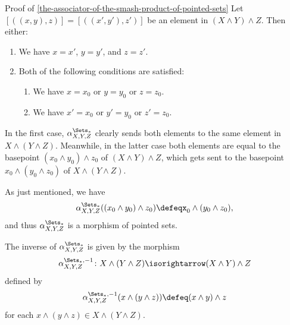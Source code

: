 \begin{Proof}{Proof of \cref{the-associator-of-the-smash-product-of-pointed-sets}}%
    Let $[((x,y),z)]=[((x',y'),z')]$ be an element in $(X\wedge Y)\wedge Z$. Then either:
    \begin{enumerate}
        \item We have $x=x'$, $y=y'$, and $z=z'$.
        \item Both of the following conditions are satisfied:
            \begin{enumerate}
                \item We have $x=x_{0}$ or $y=y_{0}$ or $z=z_{0}$.
                \item We have $x'=x_{0}$ or $y'=y_{0}$ or $z'=z_{0}$.
            \end{enumerate}
    \end{enumerate}
    In the first case, $\alpha^{\Sets_{*}}_{X,Y,Z}$ clearly sends both elements to the same element in $X\wedge(Y\wedge Z)$. Meanwhile, in the latter case both elements are equal to the basepoint $(x_{0}\wedge y_{0})\wedge z_{0}$ of $(X\wedge Y)\wedge Z$, which gets sent to the basepoint $x_{0}\wedge(y_{0}\wedge z_{0})$ of $X\wedge(Y\wedge Z)$.

    As just mentioned, we have
    \[
        \alpha^{\Sets_{*}}_{X,Y,Z}((x_{0}\wedge y_{0})\wedge z_{0})%
        \defeq%
        x_{0}\wedge(y_{0}\wedge z_{0}),%
    \]%
    and thus $\alpha^{\Sets_{*}}_{X,Y,Z}$ is a morphism of pointed sets.

    The inverse of $\alpha^{\Sets_{*}}_{X,Y,Z}$ is given by the morphism
    \[
        \alpha^{\Sets_{*},-1}_{X,Y,Z}
        \colon
        X\wedge(Y\wedge Z)
        \isorightarrow
        (X\wedge Y)\wedge Z
    \]%
    defined by
    \[
        \alpha^{\Sets_{*},-1}_{X,Y,Z}(x\wedge(y\wedge z))%
        \defeq%
        (x\wedge y)\wedge z
    \]%
    for each $x\wedge(y\wedge z)\in X\wedge(Y\wedge Z)$.


\end{Proof}
